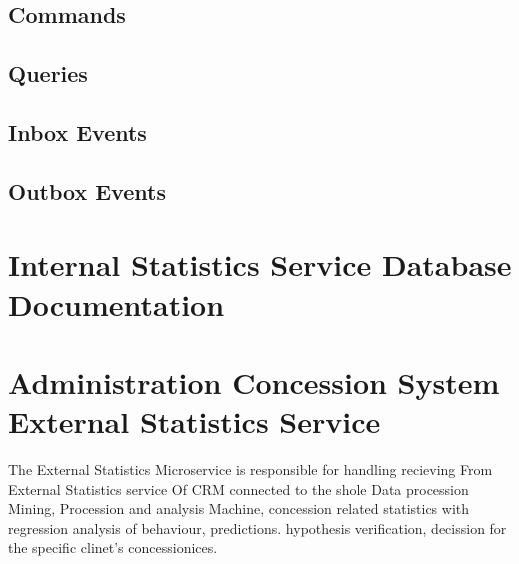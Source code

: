 \documentclass[letterpaper,10pt,english]{sphinxmanual}
\begin{document}
\subsection{Commands}
\label{\detokenize{administration_concession_system/internal_satistics_service:commands}}

\subsection{Queries}
\label{\detokenize{administration_concession_system/internal_satistics_service:queries}}

\subsection{Inbox Events}
\label{\detokenize{administration_concession_system/internal_satistics_service:inbox-events}}

\subsection{Outbox Events}
\label{\detokenize{administration_concession_system/internal_satistics_service:outbox-events}}

\section{Internal Statistics Service Database Documentation}
\label{\detokenize{administration_concession_system/internal_satistics_service:internal-statistics-service-database-documentation}}
\sphinxstepscope


\section{Administration Concession System External Statistics Service}
\label{\detokenize{administration_concession_system/external_statistics_service:administration-concession-system-external-statistics-service}}\label{\detokenize{administration_concession_system/external_statistics_service::doc}}
\sphinxAtStartPar
The External  Statistics Microservice is responsible for handling recieving From External Statistics service Of CRM connected to the shole Data procession Mining, Procession and analysis Machine, concession related statistics with regression analysis of behaviour, predictions. hypothesis verification, decission for the specific clinet’s concessionices.

\end{document}
